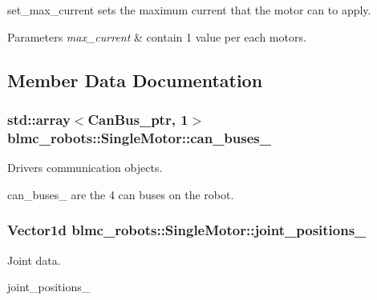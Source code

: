 set\+\_\+max\+\_\+current sets the maximum current that the motor can to apply. 


\begin{DoxyParams}{Parameters}
{\em max\+\_\+current} & contain 1 value per each motors. \\
\hline
\end{DoxyParams}


\subsection{Member Data Documentation}
\subsubsection[{\texorpdfstring{can\+\_\+buses\+\_\+}{can_buses_}}]{\setlength{\rightskip}{0pt plus 5cm}std\+::array$<${\bf Can\+Bus\+\_\+ptr}, 1$>$ blmc\+\_\+robots\+::\+Single\+Motor\+::can\+\_\+buses\+\_\+\hspace{0.3cm}{\ttfamily [private]}}\hypertarget{classblmc__robots_1_1SingleMotor_a6a57409cef4dc0959ed6b442e7626ba2}{}\label{classblmc__robots_1_1SingleMotor_a6a57409cef4dc0959ed6b442e7626ba2}


Drivers communication objects. 

can\+\_\+buses\+\_\+ are the 4 can buses on the robot. 
\subsubsection[{\texorpdfstring{joint\+\_\+positions\+\_\+}{joint_positions_}}]{\setlength{\rightskip}{0pt plus 5cm}Vector1d blmc\+\_\+robots\+::\+Single\+Motor\+::joint\+\_\+positions\+\_\+\hspace{0.3cm}{\ttfamily [private]}}\hypertarget{classblmc__robots_1_1SingleMotor_aabf1cdb3cef190305e336d3c9dcc57ea}{}\label{classblmc__robots_1_1SingleMotor_aabf1cdb3cef190305e336d3c9dcc57ea}


Joint data. 

joint\+\_\+positions\+\_\+ 
